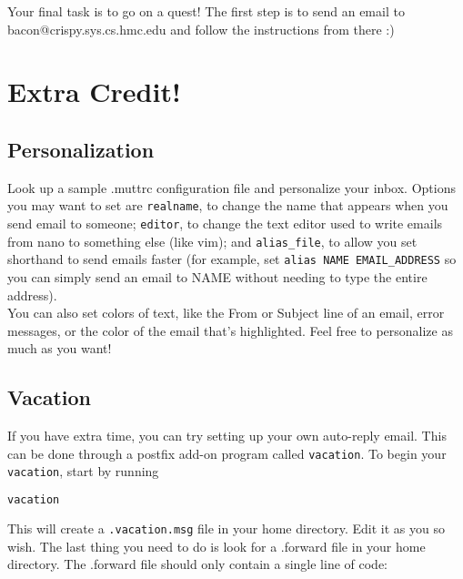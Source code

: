 \documentclass{article}
\begin{document}
\indent\indent Your final task is to go on a quest! The first step is to send an email to
bacon@crispy.sys.cs.hmc.edu and follow the instructions from there :) \\



\pagebreak

\section*{Extra Credit!}

\subsection*{Personalization}

\indent\indent Look up a sample .muttrc configuration file and personalize your inbox. Options you may want to set are \verb|realname|, to change the name that appears when you send email to someone; \verb|editor|, to change the text editor used to write emails from nano to something else (like vim); and \verb|alias_file|, to allow you set shorthand to send emails faster (for example, set \verb|alias NAME EMAIL_ADDRESS| so you can simply send an email to NAME without needing to type the entire address). \\

You can also set colors of text, like the From or Subject line of an email, error messages, or the color of the email that's highlighted. Feel free to personalize as much as you want!


\subsection*{Vacation}

\indent\indent If you have extra time, you can try setting up your own auto-reply email. This can be done through a postfix add-on program called \verb|vacation|. To begin your \verb|vacation|, start by running 

\begin{lstlisting}[basicstyle=\ttfamily, backgroundcolor = \color{lightgray}, language = bash, xleftmargin = 0cm, framexleftmargin = 1em]
vacation
\end{lstlisting}

This will create a \verb|.vacation.msg| file in your home directory. Edit it as you so wish. The last thing you need to do is look for a .forward file in your home directory. The .forward file should only contain a single line of code:
\end{document}
